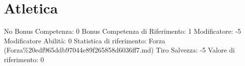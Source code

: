 \section{Atletica}\label{atletica}

\begin{description}
\tightlist
\item[Tags: ABI]
No Bonus Competenza: 0 Bonus Competenza di Riferimento: 1 Modificatore:
-5 Modificatore Abilità: 0 Statistica di riferimento: Forza
(Forza\%20edf965ddb97044e89f265858d6036ff7.md) Tiro Salvezza: -5 Valore
di riferimento: 0
\end{description}
